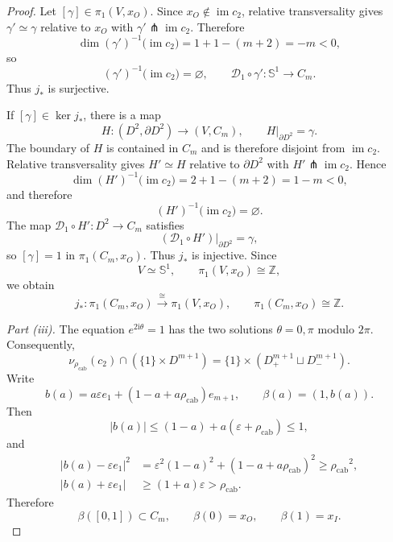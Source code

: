 \documentclass[11pt,reqno]{amsart}
\theoremstyle{definition}
\numberwithin{equation}{section}
\newcommand{\rhoCab}{{\rho_{\mathrm{cab}}}}
\begin{document}
\begin{proof}
Let $[\gamma]\in\pi_1(V,x_O)$.  Since $x_O\notin\operatorname{im}c_2$,
relative transversality gives
$\gamma'\simeq\gamma$ relative to $x_O$ with
$\gamma'\pitchfork\operatorname{im}c_2$.  Therefore
\[
 \dim (\gamma')^{-1}\bigl(\operatorname{im}c_2\bigr)
 =1+1-(m+2)=-m<0,
\]
so
\[
 (\gamma')^{-1}\bigl(\operatorname{im}c_2\bigr)=\varnothing,
 \qquad
 \mathcal D_1\circ\gamma':\mathbb S^1\longrightarrow C_m.
\]
Thus $j_*$ is surjective.

If $[\gamma]\in\ker j_*$, there is a map
\[
 H:(D^2,\partial D^2)\longrightarrow(V,C_m),
 \qquad H|_{\partial D^2}=\gamma.
\]
The boundary of $H$ is contained in $C_m$ and is therefore disjoint from
$\operatorname{im}c_2$.  Relative transversality gives
$H'\simeq H$ relative to $\partial D^2$ with
$H'\pitchfork\operatorname{im}c_2$.  Hence
\[
 \dim (H')^{-1}\bigl(\operatorname{im}c_2\bigr)
 =2+1-(m+2)=1-m<0,
\]
and therefore
\[
 (H')^{-1}\bigl(\operatorname{im}c_2\bigr)=\varnothing.
\]
The map $\mathcal D_1\circ H':D^2\to C_m$ satisfies
\[
 (\mathcal D_1\circ H')|_{\partial D^2}=\gamma,
\]
so $[\gamma]=1$ in $\pi_1(C_m,x_O)$.  Thus $j_*$ is injective.
Since
\[
 V\simeq\mathbb S^1,
 \qquad
 \pi_1(V,x_O)\cong\mathbb Z,
\]
we obtain
\[
 j_*:\pi_1(C_m,x_O)\xrightarrow{\ \cong\ }\pi_1(V,x_O),
 \qquad
 \pi_1(C_m,x_O)\cong\mathbb Z.
\]

\emph{Part \textup{(iii)}.}
The equation $e^{2\mathrm i\theta}=1$ has the two solutions
$\theta=0,\pi$ modulo $2\pi$.  Consequently,
\[
 \nu_{\rhoCab}(c_2)\cap(\{1\}\times D^{m+1})
 =\{1\}\times(D^{m+1}_+\sqcup D^{m+1}_-).
\]
Write
\[
 b(a)=a\varepsilon e_1+(1-a+a\rhoCab)e_{m+1},
 \qquad \beta(a)=(1,b(a)).
\]
Then
\[
 |b(a)|\le(1-a)+a(\varepsilon+\rhoCab)\le1,
\]
and
\begin{align*}
 |b(a)-\varepsilon e_1|^2
 &=\varepsilon^2(1-a)^2+(1-a+a\rhoCab)^2
 \ge\rhoCab^2,\\
 |b(a)+\varepsilon e_1|
 &\ge(1+a)\varepsilon>\rhoCab.
\end{align*}
Therefore
\[
 \beta([0,1])\subset C_m,
 \qquad
 \beta(0)=x_O,
 \qquad
 \beta(1)=x_I.
\]


\end{proof}
\end{document}

